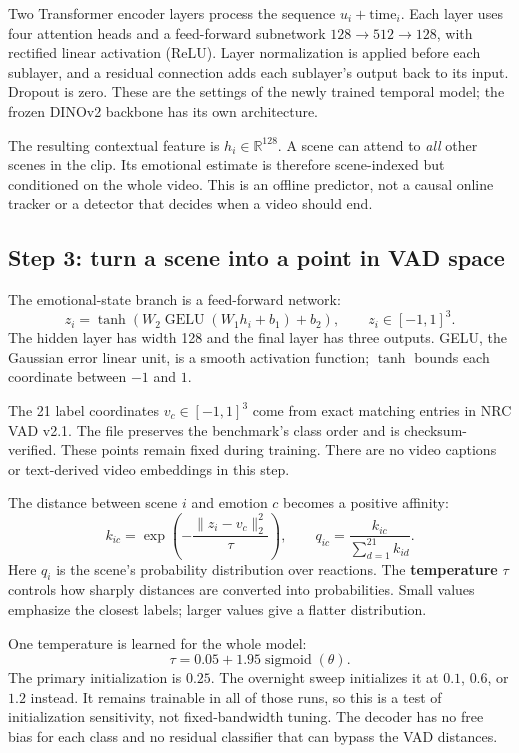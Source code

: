 \documentclass[11pt,a4paper]{article}
\newcommand{\sigmoid}{\operatorname{sigmoid}}
\newcommand{\GELU}{\operatorname{GELU}}
\begin{document}
Two Transformer encoder layers process the sequence $u_i+\mathrm{time}_i$. Each layer uses four attention heads and a feed-forward subnetwork $128\rightarrow512\rightarrow128$, with rectified linear activation (ReLU). Layer normalization is applied before each sublayer, and a residual connection adds each sublayer's output back to its input. Dropout is zero. These are the settings of the newly trained temporal model; the frozen DINOv2 backbone has its own architecture.

The resulting contextual feature is $h_i\in\mathbb{R}^{128}$. A scene can attend to \emph{all} other scenes in the clip. Its emotional estimate is therefore scene-indexed but conditioned on the whole video. This is an offline predictor, not a causal online tracker or a detector that decides when a video should end.

\subsection{Step 3: turn a scene into a point in VAD space}
The emotional-state branch is a feed-forward network:
\begin{equation}
z_i=\tanh\!\left(W_2\GELU(W_1h_i+b_1)+b_2\right),\qquad z_i\in[-1,1]^3.
\end{equation}
The hidden layer has width 128 and the final layer has three outputs. GELU, the Gaussian error linear unit, is a smooth activation function; $\tanh$ bounds each coordinate between $-1$ and $1$.

The 21 label coordinates $v_c\in[-1,1]^3$ come from exact matching entries in NRC VAD v2.1. The file preserves the benchmark's class order and is checksum-verified. These points remain fixed during training. There are no video captions or text-derived video embeddings in this step.

The distance between scene $i$ and emotion $c$ becomes a positive affinity:
\begin{equation}
k_{ic}=\exp\!\left(-\frac{\lVert z_i-v_c\rVert_2^2}{\tau}\right),\qquad
q_{ic}=\frac{k_{ic}}{\sum_{d=1}^{21}k_{id}}.
\label{eq:distance}
\end{equation}
Here $q_i$ is the scene's probability distribution over reactions. The \textbf{temperature} $\tau$ controls how sharply distances are converted into probabilities. Small values emphasize the closest labels; larger values give a flatter distribution.

One temperature is learned for the whole model:
\begin{equation}
\tau=0.05+1.95\sigmoid(\theta).
\end{equation}
The primary initialization is $0.25$. The overnight sweep initializes it at $0.1$, $0.6$, or $1.2$ instead. It remains trainable in all of those runs, so this is a test of initialization sensitivity, not fixed-bandwidth tuning. The decoder has no free bias for each class and no residual classifier that can bypass the VAD distances.
\end{document}
